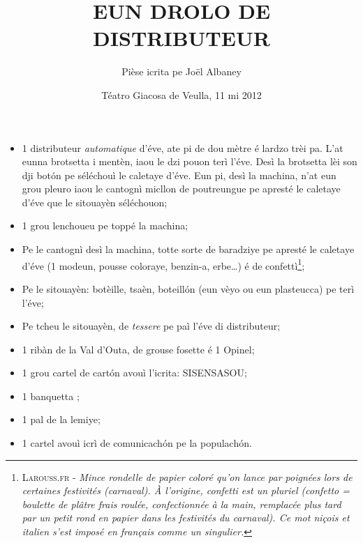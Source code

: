 \title{EUN DROLO DE DISTRIBUTEUR}
\author{Pièse icrita pe Joël Albaney}
\date{Téatro Giacosa de Veulla, 11 mi 2012}

\maketitle






\Scenographie
\begin{itemize}
\item[$\bullet$] 1 distributeur \textit{automatique} d'éve, ate pi de dou mètre é lardzo trèi pa. L'at eunna brotsetta i mentèn, iaou le dzi pouon terì l'éve. Desì la brotsetta lèi son dji bot\'on pe séléchouì le caletaye d'éve. Eun pi, desì la machina, n'at eun grou pleuro iaou le cantognì micllon de poutreungue pe apresté le caletaye d'éve que le sitouayèn séléchouon;
\item[$\bullet$] 1 grou lenchoueu pe toppé la machina;
\item[$\bullet$] Pe le cantognì desì la machina, totte sorte de baradziye pe apresté le caletaye d'éve (1 modeun, pousse coloraye, benzin-a, erbe\ldots ) é de confettì\footnote{ \textsc{Larouss.fr} - \textit{Mince rondelle de papier coloré qu'on lance par poignées lors de certaines festivités (carnaval). À l'origine, confetti est un pluriel (confetto = boulette de plâtre frais roulée, confectionnée à la main, remplacée plus tard par un petit rond en papier dans les festivités du carnaval). Ce mot niçois et italien s'est imposé en français comme un singulier.}};
\item[$\bullet$] Pe le sitouayèn: botèille, tsaèn, boteill\'on (eun vèyo ou eun plasteucca) pe terì l'éve;
\item[$\bullet$] Pe tcheu le sitouayèn, de \textit{tessere} pe paì l'éve di distributeur;
\item[$\bullet$] 1 ribàn de la Val d'Outa, de grouse fosette é 1 Opinel;
\item[$\bullet$] 1 grou cartel de cart\'on avouì l'icrita: \og SISENSASOU\fg;
\item[$\bullet$] 1 banquetta \panchina ;
\item[$\bullet$] 1 pal de la lemiye;
\item[$\bullet$] 1 cartel avouì icrì de comunicach\'on pe la populach\'on.
\end{itemize}

